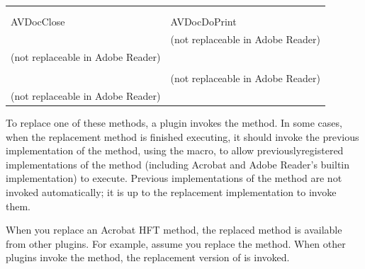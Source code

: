 \documentclass[letterpaper,12pt,english,openany,oneside]{sphinxmanual}
\begin{document}
\begin{savenotes}\sphinxattablestart
\centering
\begin{tabulary}{\linewidth}[t]{|T|T|}
\hline

&
\\
\hline
{}
&
\\
\hline
{}
&
\\
\hline
AVDocClose
&
AVDocDoPrint
\\
\hline
{}
&

(not replaceable in Adobe Reader)
\\
\hline
{}

(not replaceable in Adobe Reader)
&
\\
\hline
{}
&
\\
\hline
{}
&

(not replaceable in Adobe Reader)
\\
\hline
{}

(not replaceable in Adobe Reader)
&\\
\hline
\end{tabulary}
\par
\sphinxattableend\end{savenotes}

To replace one of these methods, a plugin invokes the  method. In some cases, when the replacement method is finished executing, it should invoke the previous implementation of the method, using the  macro, to allow previously\sphinxhyphen{}registered implementations of the method (including Acrobat and Adobe Reader’s built\sphinxhyphen{}in implementation) to execute. Previous implementations of the method are not invoked automatically; it is up to the replacement implementation to invoke them.

When you replace an Acrobat HFT method, the replaced method is available from other plugins. For example, assume you replace the  method. When other plugins invoke the  method, the replacement version of  is invoked.
\end{document}
